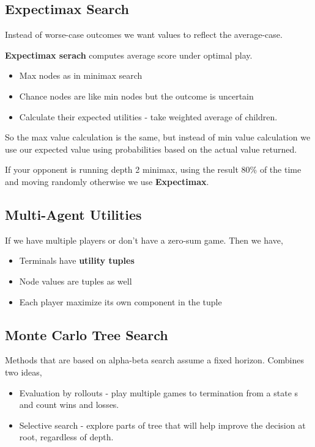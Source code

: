 \subsection{Expectimax Search}
Instead of worse-case outcomes we want values to reflect the average-case.

\textbf{Expectimax serach} computes average score under optimal play.
\begin{itemize}
    \item Max nodes as in minimax search
    \item Chance nodes are like min nodes but the outcome is uncertain
    \item Calculate their expected utilities - take weighted average of children.
\end{itemize}

So the max value calculation is the same, but instead of min value calculation we use our expected value using probabilities based on the actual value returned. 

\vspace{1em}

If your opponent is running depth 2 minimax, using the result 80\% of the time and moving randomly otherwise we use \textbf{Expectimax}.


\subsection{Multi-Agent Utilities}

If we have multiple players or don't have a zero-sum game. Then we have, 

\begin{itemize}
    \item Terminals have \textbf{utility tuples} 
    \item Node values are tuples as well
    \item Each player maximize its own component in the tuple
\end{itemize}


\subsection{Monte Carlo Tree Search}
Methods that are based on alpha-beta search assume a fixed horizon. Combines two ideas,
\begin{itemize}
    \item Evaluation by rollouts - play multiple games to termination from a state s and count wins and losses.
    \item Selective search - explore parts of tree that will help improve the decision at root, regardless of depth.
\end{itemize}
